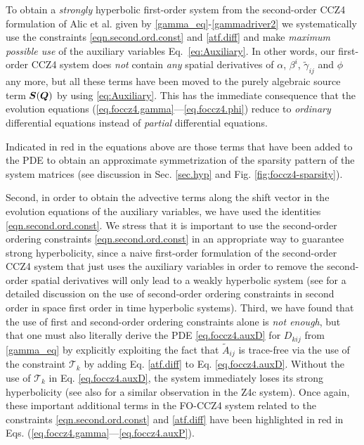 To obtain a \textit{strongly} hyperbolic
first-order system from the second-order CCZ4 formulation of Alic et
al. \cite{Alic:2011a} given by \eqref{gamma_eq}-\eqref{gammadriver2} we
systematically use the constraints \eqref{eqn.second.ord.const} and	
\eqref{atf.diff} and make \textit{maximum possible use} of the auxiliary	
variables Eq.~\eqref{eq:Auxiliary}. In other words, our first-order CCZ4
system does \textit{not} contain \textit{any} spatial derivatives of
$\alpha$, $\beta^i$, $\tilde{\gamma}_{ij}$ and $\phi$ any more, but all
these terms have been moved to the purely algebraic source term
$\boldsymbol{S}(\boldsymbol{Q})$ by using \eqref{eq:Auxiliary}. This has the
immediate consequence that the evolution equations (\ref{eq.foccz4.gamma}---\ref{eq.foccz4.phi})
reduce to \textit{ordinary} differential equations instead of \textit{partial}
differential equations.

%
Indicated in red in the equations above are those terms that have been
added to the PDE to obtain an approximate symmetrization of the sparsity
pattern of the system matrices (see discussion in Sec. \ref{sec.hyp} and
Fig. \ref{fig:foccz4-sparsity}).

Second, in
order to obtain the advective terms along the shift vector in the
evolution equations of the auxiliary variables, we have used the
identities \eqref{eqn.second.ord.const}. We stress that it is important
to use the second-order ordering constraints \eqref{eqn.second.ord.const}
in an appropriate way to guarantee strong hyperbolicity, since a naive
first-order formulation of the second-order CCZ4 system that just uses
the auxiliary variables in order to remove the second-order spatial
derivatives will only lead to a weakly hyperbolic system (see
\cite{Gundlach:2005ta} for a detailed discussion on the use of
second-order ordering constraints in second order in space first order in
time hyperbolic systems). Third, we have found that the use of first and 
second-order ordering constraints alone is \textit{not enough}, but that
one must also literally derive the PDE \eqref{eq.foccz4.auxD} for $D_{kij}$ 
from
\eqref{gamma_eq} by explicitly exploiting the fact that $\tilde{A}_{ij}$
is trace-free via the use of the constraint $\mathcal{T}_k$ by adding Eq.
\eqref{atf.diff} to Eq. \eqref{eq.foccz4.auxD}. Without the use of
$\mathcal{T}_k$ in Eq. \eqref{eq.foccz4.auxD}, the system immediately loses 
its 
strong hyperbolicity 
(see also \cite{Cao:2012} for a similar observation in the Z4c system).
Once again, these important additional terms in the FO-CCZ4 system
related to the constraints \eqref{eqn.second.ord.const} and
\eqref{atf.diff} have been highlighted in red in Eqs.
(\ref{eq.foccz4.gamma}---\ref{eq.foccz4.auxP}).


